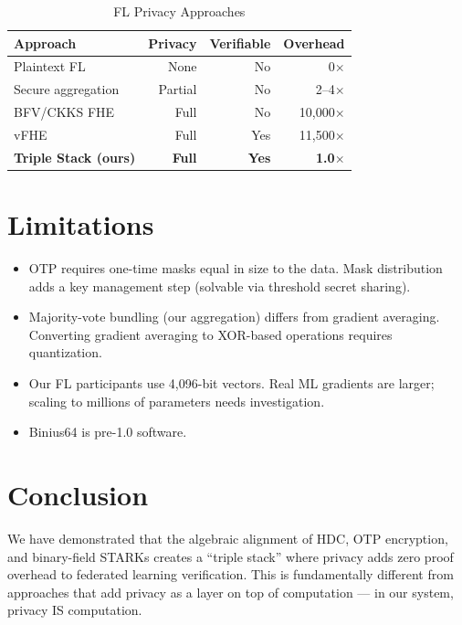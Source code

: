 \documentclass[11pt]{article}
\begin{document}
\begin{table}[h]
\centering
\caption{FL Privacy Approaches}
\begin{tabular}{@{}lrrr@{}}
\toprule
\textbf{Approach} & \textbf{Privacy} & \textbf{Verifiable} & \textbf{Overhead} \\
\midrule
Plaintext FL & None & No & 0$\times$ \\
Secure aggregation~\cite{bonawitz2017practical} & Partial & No & 2--4$\times$ \\
BFV/CKKS FHE & Full & No & 10,000$\times$ \\
vFHE~\cite{vfhe2023} & Full & Yes & 11,500$\times$ \\
\textbf{Triple Stack (ours)} & \textbf{Full} & \textbf{Yes} & \textbf{1.0$\times$} \\
\bottomrule
\end{tabular}
\end{table}

\section{Limitations}

\begin{itemize}
    \item OTP requires one-time masks equal in size to the data. Mask distribution adds a key management step (solvable via threshold secret sharing).
    \item Majority-vote bundling (our aggregation) differs from gradient averaging. Converting gradient averaging to XOR-based operations requires quantization.
    \item Our FL participants use 4,096-bit vectors. Real ML gradients are larger; scaling to millions of parameters needs investigation.
    \item Binius64 is pre-1.0 software.
\end{itemize}

\section{Conclusion}

We have demonstrated that the algebraic alignment of HDC, OTP encryption, and binary-field STARKs creates a ``triple stack'' where privacy adds zero proof overhead to federated learning verification. This is fundamentally different from approaches that add privacy as a layer on top of computation --- in our system, privacy IS computation.
\end{document}

